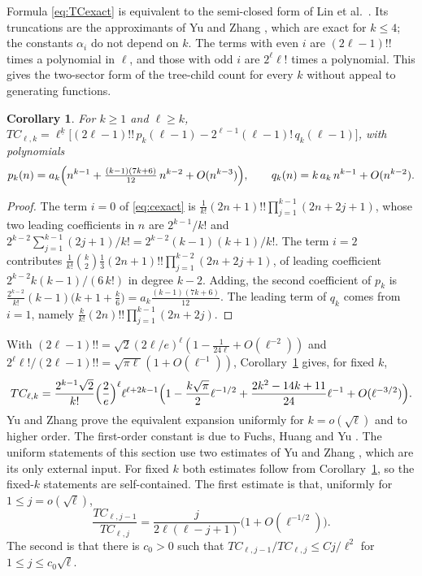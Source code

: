 \documentclass[11pt,a4paper]{article}
\newtheorem{corollary}[theorem]{Corollary}
\theoremstyle{definition}
\begin{document}
Formula \eqref{eq:TCexact} is equivalent to the semi-closed form of Lin et al.\ \cite{Lin26}. Its truncations are the approximants of Yu and Zhang \cite[App.~A]{YZasym}, which are exact for $k\le4$; the constants $\alpha_i$ do not depend on $k$. The terms with even $i$ are $(2\ell-1)!!$ times a polynomial in $\ell$, and those with odd $i$ are $2^{\ell}\ell!$ times a polynomial. This gives the two-sector form of the tree-child count for every $k$ without appeal to generating functions.

\begin{corollary}\label{cor:sectors}
For $k\ge1$ and $\ell\ge k$, $TC_{\ell,k}=\ell^{\underline k}\bigl[(2\ell-1)!!\,p_k(\ell-1)-2^{\ell-1}(\ell-1)!\,q_k(\ell-1)\bigr]$, with polynomials
\[
p_k(n)=a_k\Bigl(n^{k-1}+\tfrac{(k-1)(7k+6)}{12}\,n^{k-2}+O(n^{k-3})\Bigr),\qquad q_k(n)=k\,a_k\,n^{k-1}+O(n^{k-2}).
\]
\end{corollary}

\begin{proof}
The term $i=0$ of \eqref{eq:cexact} is $\frac1{k!}(2n+1)!!\prod_{j=1}^{k-1}(2n+2j+1)$, whose two leading coefficients in $n$ are $2^{k-1}/k!$ and $2^{k-2}\sum_{j=1}^{k-1}(2j+1)/k!=2^{k-2}(k-1)(k+1)/k!$. The term $i=2$ contributes $\frac{1}{k!}\binom k2\frac13(2n+1)!!\prod_{j=1}^{k-2}(2n+2j+1)$, of leading coefficient $2^{k-2}k(k-1)/(6\,k!)$ in degree $k-2$. Adding, the second coefficient of $p_k$ is $\frac{2^{k-2}}{k!}(k-1)\bigl(k+1+\frac k6\bigr)=a_k\frac{(k-1)(7k+6)}{12}$. The leading term of $q_k$ comes from $i=1$, namely $\frac{k}{k!}(2n)!!\prod_{j=1}^{k-1}(2n+2j)$.
\end{proof}

With $(2\ell-1)!!=\sqrt2(2\ell/e)^\ell(1-\frac1{24\ell}+O(\ell^{-2}))$ and $2^\ell\ell!/(2\ell-1)!!=\sqrt{\pi\ell}(1+O(\ell^{-1}))$, Corollary~\ref{cor:sectors} gives, for fixed $k$,
\begin{equation}\label{eq:TCexp}
TC_{\ell,k}=\frac{2^{k-1}\sqrt2}{k!}\Bigl(\frac2e\Bigr)^{\ell}\ell^{\ell+2k-1}\Bigl(1-\frac{k\sqrt\pi}{2}\ell^{-1/2}+\frac{2k^2-14k+11}{24}\ell^{-1}+O(\ell^{-3/2})\Bigr).
\end{equation}
Yu and Zhang \cite[Prop.~4.1]{YZasym} prove the equivalent expansion uniformly for $k=o(\sqrt\ell)$ and to higher order. The first-order constant is due to Fuchs, Huang and Yu \cite{FHY}. The uniform statements of this section use two estimates of Yu and Zhang \cite[Prop.~B1 and Eq.~(E15)]{YZasym}, which are its only external input. For fixed $k$ both estimates follow from Corollary~\ref{cor:sectors}, so the fixed-$k$ statements are self-contained. The first estimate is that, uniformly for $1\le j=o(\sqrt\ell)$,
\begin{equation}\label{eq:TCratio}
\frac{TC_{\ell,j-1}}{TC_{\ell,j}}=\frac{j}{2\ell(\ell-j+1)}\bigl(1+O(\ell^{-1/2})\bigr).
\end{equation}
The second is that there is $c_0>0$ such that $TC_{\ell,j-1}/TC_{\ell,j}\le Cj/\ell^2$ for $1\le j\le c_0\sqrt\ell$.
\end{document}
